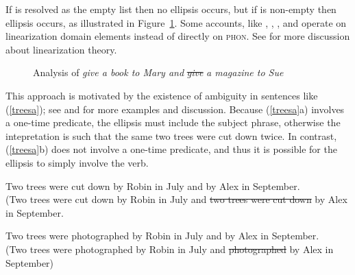 \noindent
If  is resolved as the empty list then no ellipsis occurs, but if  is non-empty then ellipsis occurs, as illustrated in Figure~\ref{lpe}. 
Some accounts, like  \citet{yatabe01}, \citet{Crysmann:04}, \citet{Beavers}, and \citet{chaveslp} operate on
linearization domain\label{page-linearization-domains-in-coordination-two} elements instead of directly on \textsc{phon}.  
See  for more discussion about linearization theory.


\begin{figure}
    \centering

    \caption{Analysis of \emph{give a book to Mary and} \sout{\emph{give}} \emph{a magazine to Sue}}\label{lpe}
\end{figure}

\noindent
This approach is motivated by the existence of ambiguity in 
sentences like (\ref{treesa}); see  \citet{Beavers} and \citet{chaves06} for more examples and discussion. Because (\ref{treesa}a) involves a one-time predicate, the ellipsis must include the subject phrase, otherwise
the intepretation is such that the same two trees were cut down twice. In contrast,  (\ref{treesa}b) does not involve a one-time
predicate, and thus it is possible for the ellipsis to simply
involve the verb.


\eal
\label{treesa}
\ex Two trees were cut down by Robin in July and by Alex in September.\\
(Two trees were cut down by Robin in July and \sout{two trees were cut down} by Alex in September.

\ex Two trees were photographed by Robin in July and by Alex in September.\\
(Two trees were photographed by Robin in July and \sout{photographed} by Alex in September)
\zl



